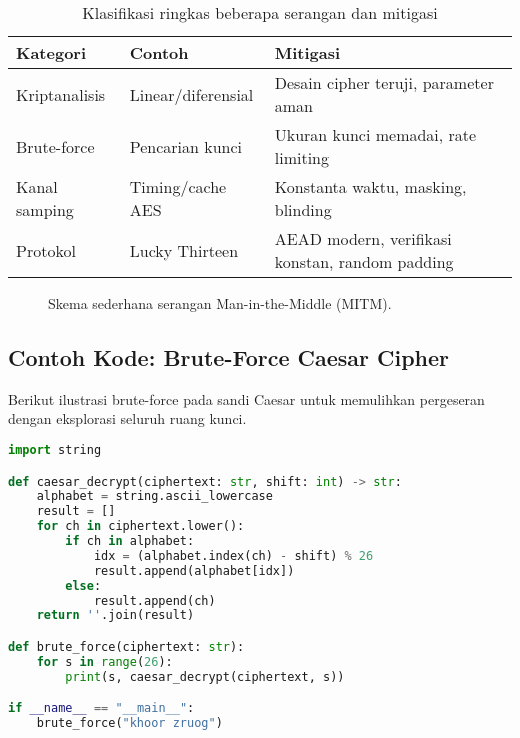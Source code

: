 \documentclass[../main.tex]{subfiles}
\begin{document}
\begin{table}[h]
\centering
\caption{Klasifikasi ringkas beberapa serangan dan mitigasi}
\label{tab:serangan}
\begin{tabular}{lll}
\toprule
Kategori & Contoh & Mitigasi \\
\midrule
Kriptanalisis & Linear/diferensial & Desain cipher teruji, parameter aman \\
Brute-force & Pencarian kunci & Ukuran kunci memadai, rate limiting \\
Kanal samping & Timing/cache AES \parencite{bernstein2005aes} & Konstanta waktu, masking, blinding \\
Protokol & Lucky Thirteen \parencite{lucky13} & AEAD modern, verifikasi konstan, random padding \\
\bottomrule
\end{tabular}
\end{table}

\begin{figure}[h]
\centering
{}
\caption{Skema sederhana serangan Man-in-the-Middle (MITM).}
\label{fig:mitm}
\end{figure}

\subsection{Contoh Kode: Brute-Force Caesar Cipher}
Berikut ilustrasi brute-force pada sandi Caesar untuk memulihkan pergeseran dengan eksplorasi seluruh ruang kunci.

\begin{lstlisting}[language=Python, caption={Brute-force Caesar}, label={lst:caesar}]
import string

def caesar_decrypt(ciphertext: str, shift: int) -> str:
    alphabet = string.ascii_lowercase
    result = []
    for ch in ciphertext.lower():
        if ch in alphabet:
            idx = (alphabet.index(ch) - shift) % 26
            result.append(alphabet[idx])
        else:
            result.append(ch)
    return ''.join(result)

def brute_force(ciphertext: str):
    for s in range(26):
        print(s, caesar_decrypt(ciphertext, s))

if __name__ == "__main__":
    brute_force("khoor zruog")
\end{lstlisting}
\end{document}
